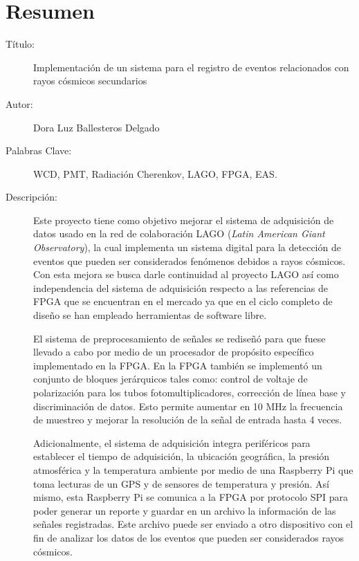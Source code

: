 \chapter*{Resumen}

\footnotesize{
\begin{description}
  \item[Título:] Implementación de un sistema para el registro de eventos relacionados con
rayos cósmicos secundarios 
  \item[Autor:] Dora Luz Ballesteros Delgado 
  \item[Palabras Clave:] WCD, PMT, Radiación Cherenkov, LAGO, FPGA, EAS.
  \item[Descripción:] 
  Este proyecto tiene como objetivo mejorar el sistema de adquisición de datos usado en la red de colaboración LAGO (\textit{Latin American Giant Observatory}), la cual implementa un sistema digital para la detección de eventos que pueden ser considerados fenómenos debidos a rayos cósmicos.
  Con esta mejora se busca darle continuidad al proyecto LAGO así como independencia del sistema de adquisición respecto a las referencias de FPGA que se encuentran en el mercado ya que en el ciclo completo de diseño se han empleado herramientas de software libre.

El sistema de preprocesamiento de señales se rediseñó para que fuese llevado a cabo por medio de un procesador de propósito específico implementado en la FPGA.
En la FPGA también se implementó un conjunto de bloques jerárquicos tales como: control de voltaje de polarización para los tubos fotomultiplicadores, corrección de línea base y discriminación de datos.
Esto permite aumentar en 10 MHz la frecuencia de muestreo y mejorar la resolución de la señal de entrada hasta 4 veces.

Adicionalmente, el sistema de adquisición integra periféricos para establecer el tiempo de adquisición, la ubicación geográfica, la presión atmosférica y la temperatura ambiente por medio de una Raspberry Pi que toma lecturas de un GPS y de sensores de temperatura y presión.
Así mismo, esta Raspberry Pi se comunica a la FPGA por protocolo SPI para poder generar un reporte y guardar en un archivo la información de las señales registradas.
Este archivo puede ser enviado a otro dispositivo con el fin de analizar los datos de los eventos que pueden ser considerados rayos cósmicos.



\end{description}}
